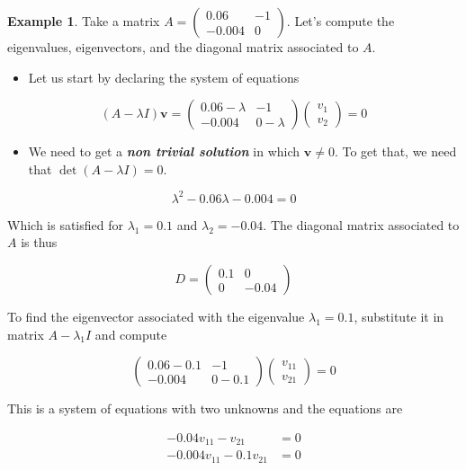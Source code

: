 \documentclass[a4paper,11pt]{article}
\theoremstyle{definition}
\newtheorem{example}{Example}
\theoremstyle{plain}
\begin{document}
\begin{example}
Take a matrix \(A = \begin{pmatrix} 0.06 & -1 \\ -0.004 & 0 \end{pmatrix}\). Let's
compute the eigenvalues, eigenvectors, and the diagonal matrix
associated to \(A\).

\begin{itemize}
\item
  Let us start by declaring the system of equations
\end{itemize}

\[
(A - \lambda I) \mathbf{v} = \begin{pmatrix} 0.06 - \lambda & -1 \\ -0.004 & 0 - \lambda \end{pmatrix} \begin{pmatrix} v_1 \\ v_2 \end{pmatrix} = 0
\]

\begin{itemize}
\item
  We need to get a \textbf{\emph{non trivial solution}} in which
  \(\mathbf{v}\neq 0\). To get that, we need that
  \(\det(A-\lambda I) = 0\).
\end{itemize}

\[
\lambda^2 - 0.06\lambda -0.004 = 0
\]

    Which is satisfied for \(\lambda_1 = 0.1\) and \(\lambda_2 = -0.04\).
The diagonal matrix associated to \(A\) is thus

\[
D = \begin{pmatrix} 0.1 & 0 \\ 0 & -0.04 \end{pmatrix}
\]

To find the eigenvector associated with the eigenvalue
\(\lambda_1 = 0.1\), substitute it in matrix \(A-\lambda_1 I\) and
compute

\[
\begin{pmatrix} 0.06-0.1 & -1 \\ -0.004 & 0 - 0.1 \end{pmatrix}\begin{pmatrix} v_{11} \\ v_{21} \end{pmatrix} = 0
\]

This is a system of equations with two unknowns and the equations are

\begin{align*}
-0.04 v_{11} - v_{21} &= 0 \\
-0.004 v_{11} - 0.1 v_{21} &= 0 
\end{align*}


\end{example}
\end{document}
